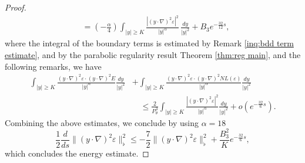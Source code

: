 \documentclass[11pt,reqno]{amsart}
\theoremstyle{definition}
\theoremstyle{bfremark}
\numberwithin{equation}{section}
\begin{document}
\begin{proof}
\begin{align*}
&= \left( -\frac{\alpha}{4} \right) \int_{|y| \geq K} \frac{|(y \cdot \nabla)^2 \varepsilon|^2}{|y|^{\alpha}}\,\frac{dy}{|y|^2}+B_3e^{-\frac{32}{12}s},
\end{align*}
where the integral of the boundary terms is estimated by Remark \ref{inq:bdd term estimate}, and by the parabolic regularity result Theorem \ref{thm:reg main}, and the following remarks, we have
\begin{align*}
     \int_{|y| \geq K} \frac{(y \cdot \nabla )^2\varepsilon \cdot (y \cdot \nabla)^2 E}{|y|^{\alpha}}\frac{dy}{|y|^2}&+\int_{|y| \geq K} \frac{(y \cdot \nabla)^2\varepsilon \cdot (y \cdot \nabla)^2 NL(\varepsilon)}{|y|^{\alpha}}\frac{dy}{|y|^2} \\
     & \quad \leq \frac{2}{P_{\theta}^3} \int_{|y|\geq K}\frac{|(y \cdot \nabla)^2 \varepsilon|^2}{|y|^{\alpha}}\frac{dy}{|y|^2}+o(e^{-\frac{32}{6}s}).
\end{align*}
Combining the above estimates, we conclude by using \(\alpha=18\)
\[
\frac{1}{2} \frac{d}{ds} \|(y \cdot \nabla)^2 \varepsilon\|_{\flat}^2 
\leq -\frac{7}{2}\|(y \cdot \nabla)^2 \varepsilon\|_{\flat}^2 + \frac{B_3^2}{K}  e^{-\frac{32}{6}s},
\]
which concludes the energy estimate.
\end{proof}
\end{document}
